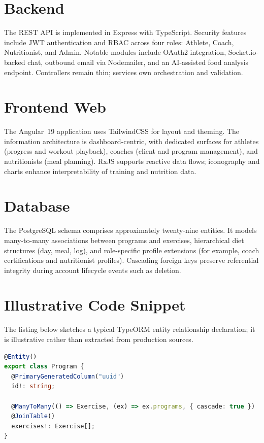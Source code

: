 \documentclass[11pt,a4paper]{report}
\begin{document}
\section{Backend}
The REST API is implemented in Express with TypeScript. Security features include JWT authentication and RBAC across four roles: Athlete, Coach, Nutritionist, and Admin. Notable modules include OAuth2 integration, Socket.io-backed chat, outbound email via Nodemailer, and an AI-assisted food analysis endpoint. Controllers remain thin; services own orchestration and validation.

\section{Frontend Web}
The Angular~19 application uses TailwindCSS for layout and theming. The information architecture is dashboard-centric, with dedicated surfaces for athletes (progress and workout playback), coaches (client and program management), and nutritionists (meal planning). RxJS supports reactive data flows; iconography and charts enhance interpretability of training and nutrition data.

\section{Database}
The PostgreSQL schema comprises approximately twenty-nine entities. It models many-to-many associations between programs and exercises, hierarchical diet structures (day, meal, log), and role-specific profile extensions (for example, coach certifications and nutritionist profiles). Cascading foreign keys preserve referential integrity during account lifecycle events such as deletion.

\section{Illustrative Code Snippet}
The listing below sketches a typical TypeORM entity relationship declaration; it is illustrative rather than extracted from production sources.

\begin{lstlisting}[language=TypeScript, caption={Illustrative TypeORM entity association (conceptual)}]
@Entity()
export class Program {
  @PrimaryGeneratedColumn("uuid")
  id!: string;

  @ManyToMany(() => Exercise, (ex) => ex.programs, { cascade: true })
  @JoinTable()
  exercises!: Exercise[];
}
\end{lstlisting}
\end{document}
